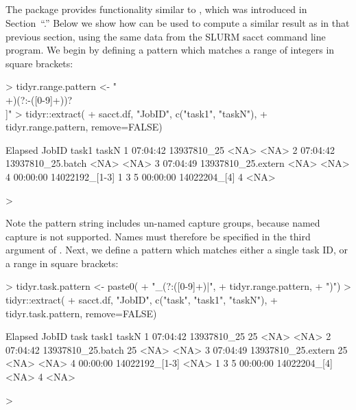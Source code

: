 \subsection{\sectiontidyr}
\label{sec:tidyr}

The  package provides functionality similar to
, which was introduced in
Section~``\sectiondf.'' Below we show how
 can be used to compute a similar result as in
that previous section, using the same data from the SLURM sacct
command line program. We begin by defining a pattern which matches a
range of integers in square brackets:

\begin{Schunk}
\begin{Sinput}
> tidyr.range.pattern <- "\\[([0-9]+)(?:-([0-9]+))?\\]"
> tidyr::extract(
+   sacct.df, "JobID", c("task1", "taskN"), 
+   tidyr.range.pattern, remove=FALSE)
\end{Sinput}
\begin{Soutput}
   Elapsed              JobID task1 taskN
1 07:04:42        13937810_25  <NA>  <NA>
2 07:04:42  13937810_25.batch  <NA>  <NA>
3 07:04:49 13937810_25.extern  <NA>  <NA>
4 00:00:00     14022192_[1-3]     1     3
5 00:00:00       14022204_[4]     4  <NA>
\end{Soutput}
\begin{Sinput}
> 
\end{Sinput}
\end{Schunk}

Note the pattern string includes un-named capture groups, because
named capture is not supported. Names must therefore be specified in
the third argument of . Next, we define a pattern which
matches either a single task ID, or a range in square brackets:

\begin{Schunk}
\begin{Sinput}
> tidyr.task.pattern <- paste0(
+   "_(?:([0-9]+)|",
+   tidyr.range.pattern, 
+   ")")
> tidyr::extract(
+   sacct.df, "JobID", c("task", "task1", "taskN"), 
+   tidyr.task.pattern, remove=FALSE)
\end{Sinput}
\begin{Soutput}
   Elapsed              JobID task task1 taskN
1 07:04:42        13937810_25   25  <NA>  <NA>
2 07:04:42  13937810_25.batch   25  <NA>  <NA>
3 07:04:49 13937810_25.extern   25  <NA>  <NA>
4 00:00:00     14022192_[1-3] <NA>     1     3
5 00:00:00       14022204_[4] <NA>     4  <NA>
\end{Soutput}
\begin{Sinput}
> 
\end{Sinput}
\end{Schunk}

